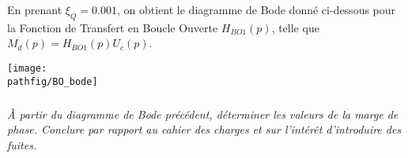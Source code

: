 \documentclass[10pt,fleqn]{article} %
\begin{document}
\begin{multicols}{2}
En prenant $\xi_{Q}=\num{0,001}$, on obtient le diagramme de Bode donné ci-dessous
pour la Fonction de Transfert en Boucle Ouverte ${H}_{BO1}(p)$, telle que ${M}_{d}(p) = {H}_{BO1}(p){U}_{c}(p)$. 


\begin{center}
\texttt{[image: \\pathfig/BO\_bode]}
\end{center}



%

%
% 
%
%
%
%
%
%
%
%




\subparagraph{}\textit{\`A partir du diagramme de Bode précédent,
déterminer les valeurs de la marge de phase. Conclure par rapport au cahier des charges et sur l'intérêt d'introduire des fuites.}



\end{multicols}
\end{document}
